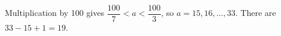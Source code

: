 Multiplication by 100 gives $\dfrac{100}{7}<a<\dfrac{100}{3}$, so $a=15,16,\ldots,33$. There are $33-15+1=\boxed{19}$.

